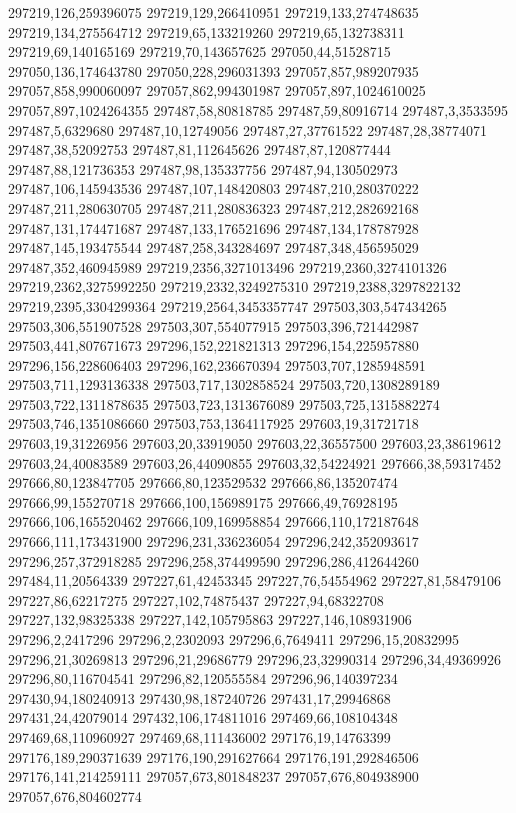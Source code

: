 297219,126,259396075
297219,129,266410951
297219,133,274748635
297219,134,275564712
297219,65,133219260
297219,65,132738311
297219,69,140165169
297219,70,143657625
297050,44,51528715
297050,136,174643780
297050,228,296031393
297057,857,989207935
297057,858,990060097
297057,862,994301987
297057,897,1024610025
297057,897,1024264355
297487,58,80818785
297487,59,80916714
297487,3,3533595
297487,5,6329680
297487,10,12749056
297487,27,37761522
297487,28,38774071
297487,38,52092753
297487,81,112645626
297487,87,120877444
297487,88,121736353
297487,98,135337756
297487,94,130502973
297487,106,145943536
297487,107,148420803
297487,210,280370222
297487,211,280630705
297487,211,280836323
297487,212,282692168
297487,131,174471687
297487,133,176521696
297487,134,178787928
297487,145,193475544
297487,258,343284697
297487,348,456595029
297487,352,460945989
297219,2356,3271013496
297219,2360,3274101326
297219,2362,3275992250
297219,2332,3249275310
297219,2388,3297822132
297219,2395,3304299364
297219,2564,3453357747
297503,303,547434265
297503,306,551907528
297503,307,554077915
297503,396,721442987
297503,441,807671673
297296,152,221821313
297296,154,225957880
297296,156,228606403
297296,162,236670394
297503,707,1285948591
297503,711,1293136338
297503,717,1302858524
297503,720,1308289189
297503,722,1311878635
297503,723,1313676089
297503,725,1315882274
297503,746,1351086660
297503,753,1364117925
297603,19,31721718
297603,19,31226956
297603,20,33919050
297603,22,36557500
297603,23,38619612
297603,24,40083589
297603,26,44090855
297603,32,54224921
297666,38,59317452
297666,80,123847705
297666,80,123529532
297666,86,135207474
297666,99,155270718
297666,100,156989175
297666,49,76928195
297666,106,165520462
297666,109,169958854
297666,110,172187648
297666,111,173431900
297296,231,336236054
297296,242,352093617
297296,257,372918285
297296,258,374499590
297296,286,412644260
297484,11,20564339
297227,61,42453345
297227,76,54554962
297227,81,58479106
297227,86,62217275
297227,102,74875437
297227,94,68322708
297227,132,98325338
297227,142,105795863
297227,146,108931906
297296,2,2417296
297296,2,2302093
297296,6,7649411
297296,15,20832995
297296,21,30269813
297296,21,29686779
297296,23,32990314
297296,34,49369926
297296,80,116704541
297296,82,120555584
297296,96,140397234
297430,94,180240913
297430,98,187240726
297431,17,29946868
297431,24,42079014
297432,106,174811016
297469,66,108104348
297469,68,110960927
297469,68,111436002
297176,19,14763399
297176,189,290371639
297176,190,291627664
297176,191,292846506
297176,141,214259111
297057,673,801848237
297057,676,804938900
297057,676,804602774
